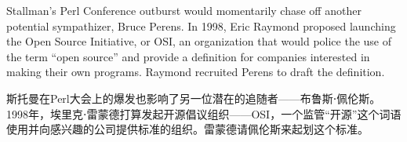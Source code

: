 \ifdefined\eng
Stallman's Perl Conference outburst would momentarily chase off another potential sympathizer, Bruce Perens. In 1998, Eric Raymond proposed launching the Open Source Initiative, or OSI, an organization that would police the use of the term ``open source'' and provide a definition for companies interested in making their own programs. Raymond recruited Perens to draft the definition.
\fi

\ifdefined\chs
斯托曼在Perl大会上的爆发也影响了另一位潜在的追随者——布鲁斯⋅佩伦斯。1998年，埃里克⋅雷蒙德打算发起开源倡议组织——OSI，一个监管``开源''这个词语使用并向感兴趣的公司提供标准的组织。雷蒙德请佩伦斯来起划这个标准。
\fi






